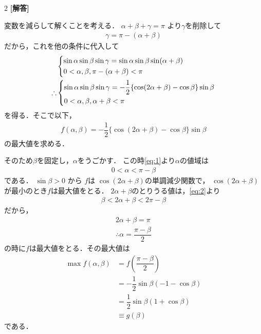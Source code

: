 \documentclass[../../main.tex]{subfiles}
\begin{document}
\setcounter{equation}{0}
\begin{oframed}
  
\end{oframed}
\setlength{\columnseprule}{0.4pt}
\begin{multicols}{2}
  {\bf [解答]}

  変数を減らして解くことを考える．
  $\alpha + \beta + \gamma = \pi$ より$\gamma$を削除して
  \begin{align}
    \gamma = \pi - (\alpha + \beta)
  \end{align}
  だから，これを他の条件に代入して
  \begin{align}
    &
    \begin{dcases}
      \sin\alpha\sin\beta\sin\gamma = \sin\alpha\sin\beta\sin(\alpha+\beta) \\
      0 < \alpha, \beta, \pi - (\alpha + \beta) < \pi
    \end{dcases}                  \\
    \therefore
    &
    \begin{dcases}
      \sin\alpha\sin\beta\sin\gamma = -\dfrac{1}{2}\{\cos(2\alpha+\beta)-\cos\beta\}\sin\beta \\
      0 < \alpha, \beta, \alpha+\beta < \pi
    \end{dcases} \label{eq:1}
  \end{align}
  を得る．そこで以下，
  \begin{align}
    f(\alpha,\beta) =  -\dfrac{1}{2}\{\cos(2\alpha+\beta)-\cos\beta\}\sin\beta
  \end{align}
  の最大値を求める．

  そのため$\beta$を固定し，$\alpha$をうごかす．
  この時\cref{eq:1}より$\alpha$の値域は
  \begin{align}
    0 < \alpha < \pi-\beta \label{eq:2}
  \end{align}
  である．
  $\sin\beta > 0$ から $f$は $\cos(2\alpha+\beta)$の単調減少関数で，
  $\cos(2\alpha+\beta)$が最小のとき$f$は最大値をとる．
  $2\alpha+\beta$のとりうる値は，\cref{eq:2}より
  \begin{align}
    \beta < 2\alpha+\beta < 2\pi-\beta
  \end{align}
  だから，
  \begin{align}
    2\alpha+\beta = \pi \\
    \therefore
    \alpha = \dfrac{\pi-\beta}{2}
  \end{align}
  の時に$f$は最大値をとる．その最大値は
  \begin{align}
    \max f(\alpha,\beta)
    & = f\left(\dfrac{\pi-\beta}{2}\right)   \\
    & = -\dfrac{1}{2}\sin\beta(-1-\cos\beta) \\
    & = \dfrac{1}{2}\sin\beta(1+\cos\beta)   \\
    & \equiv g(\beta)
  \end{align}
  である．


\end{multicols}
\end{document}
